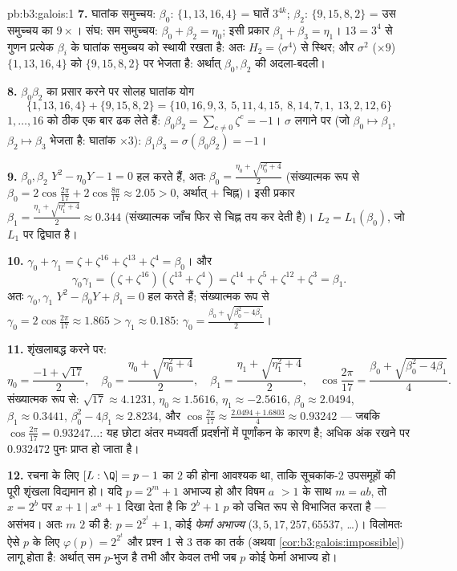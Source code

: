 \begin{solution}{pb:b3:galois:1}
\textbf{7.} घातांक समुच्चय: $\beta_0$: $\{1, 13, 16, 4\}$ = घातें $3^{4k}$; $\beta_2$:
$\{9, 15, 8, 2\}$ = उस समुच्चय का $9 \times$। संघ: सम समुच्चय: $\beta_0 + \beta_2 = \eta_0$; इसी प्रकार
$\beta_1 + \beta_3 = \eta_1$। $13 = 3^4$ से गुणन प्रत्येक $\beta_i$ के घातांक समुच्चय को स्थायी रखता
है: अतः $H_2 =
\langle\sigma^4\rangle$ से स्थिर; और $\sigma^2$ ($\times 9$) $\{1,13,16,4\}$ को $\{9, 15, 8, 2\}$ पर भेजता
है: अर्थात् $\beta_0,
\beta_2$ की अदला-बदली।

\textbf{8.} $\beta_0\beta_2$ का प्रसार करने पर सोलह घातांक योग
\[
\{1,13,16,4\} + \{9,15,8,2\} =
\{10,16,9,3,\ 5,11,4,15,\ 8,14,7,1,\ 13,2,12,6\}
\]
$1, \dots, 16$ को ठीक एक बार ढक लेते हैं: $\beta_0\beta_2 =
\sum_{c\ne0}\zeta^c = -1$। $\sigma$ लगाने पर (जो $\beta_0 \mapsto \beta_1$,
$\beta_2 \mapsto \beta_3$ भेजता है: घातांक $\times 3$): $\beta_1\beta_3 = \sigma(\beta_0\beta_2)
= -1$।

\textbf{9.} $\beta_0, \beta_2$ $Y^2 - \eta_0 Y - 1 = 0$ हल करते हैं, अतः $\beta_0 = \frac{\eta_0 + \sqrt{\eta_0^2 + 4}}2$ (संख्यात्मक रूप से
$\beta_0 = 2\cos\frac{2\pi}{17} + 2\cos\frac{8\pi}{17} \approx
2.05 > 0$, अर्थात् $+$ चिह्न)। इसी प्रकार $\beta_1 = \frac{\eta_1 +
\sqrt{\eta_1^2 + 4}}2 \approx 0.344$ (संख्यात्मक जाँच फिर
से चिह्न तय कर देती है)। $L_2 = L_1(\beta_0)$, जो $L_1$ पर द्विघात है।

\textbf{10.} $\gamma_0 + \gamma_1 = \zeta + \zeta^{16} +
\zeta^{13} + \zeta^4 = \beta_0$। और
\[
\gamma_0\gamma_1 = (\zeta + \zeta^{16})(\zeta^{13} + \zeta^4)
= \zeta^{14} + \zeta^{5} + \zeta^{12} + \zeta^{3} = \beta_1 .
\]
अतः $\gamma_0, \gamma_1$ $Y^2 - \beta_0Y + \beta_1 = 0$ हल करते हैं; संख्यात्मक रूप से $\gamma_0 = 2\cos\frac{2\pi}{17} \approx 1.865 >
\gamma_1 \approx 0.185$: $\gamma_0 = \frac{\beta_0 +
\sqrt{\beta_0^2 - 4\beta_1}}2$।

\textbf{11.} शृंखलाबद्ध करने पर:
\[
\eta_0 = \frac{-1 + \sqrt{17}}2,
\quad
\beta_0 = \frac{\eta_0 + \sqrt{\eta_0^2 + 4}}2,
\quad
\beta_1 = \frac{\eta_1 + \sqrt{\eta_1^2 + 4}}2,
\quad
\cos\frac{2\pi}{17} = \frac{\beta_0 + \sqrt{\beta_0^2 -
4\beta_1}}4 .
\]
संख्यात्मक रूप से: $\sqrt{17} \approx 4.1231$, $\eta_0 \approx
1.5616$, $\eta_1 \approx -2.5616$, $\beta_0 \approx 2.0494$, $\beta_1 \approx 0.3441$, $\beta_0^2 - 4\beta_1 \approx
2.8234$, और
$\cos\frac{2\pi}{17} \approx \frac{2.0494 +
1.6803}4 \approx 0.93242$ --- जबकि $\cos\frac{2\pi}{17} =
0.93247\dots$: यह छोटा अंतर मध्यवर्ती प्रदर्शनों में पूर्णांकन
के कारण है; अधिक अंक रखने पर $0.932472$ पुनः प्राप्त हो जाता है।

\textbf{12.} रचना के लिए $[L:\Q] = p - 1$ का $2$ की  होना आवश्यक था, ताकि
सूचकांक-$2$ उपसमूहों की पूरी शृंखला विद्यमान हो। यदि $p = 2^m + 1$ अभाज्य
हो और विषम $a$ $>
1$ के साथ $m = ab$, तो $x = 2^b$ पर $x + 1 \mid x^a + 1$ दिखा देता
है कि $2^b + 1$ $p$ को उचित रूप से विभाजित करता है --- असंभव। अतः
$m$ $2$ की  है: $p =
2^{2^t} + 1$, कोई \emph{फेर्मा अभाज्य} ($3, 5, 17, 257, 65537$,
\dots)। विलोमतः ऐसे $p$ के लिए $\varphi(p) = 2^{2^t}$ और प्रश्न 1 से 3 तक का तर्क
(अथवा \cref{cor:b3:galois:impossible}) लागू होता है: अर्थात् सम $p$-भुज  है तभी और
केवल तभी जब $p$ कोई फेर्मा अभाज्य हो।


\end{solution}
